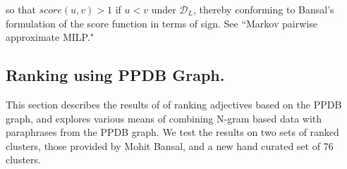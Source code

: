 so that $score(u,v) > 1$ if $u < v$ under $\mathcal{D}_L$, thereby conforming to Bansal's formulation of the score function in terms of sign. See ``Markov pairwise approximate MILP."

\subsection{Ranking using PPDB Graph.}

This section describes the results of of ranking adjectives based on the PPDB graph, and explores various means of combining N-gram based data with paraphrases from the PPDB graph. We test the results on two sets of ranked clusters, those provided by Mohit Bansal, and a new hand curated set of 76 clusters. 

